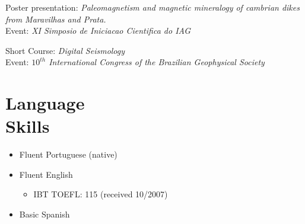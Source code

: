\documentclass[margin,line]{resume}
\begin{document}
\begin{resume}
\begin{list1}
		\item[] Poster presentation: \textit{Paleomagnetism and magnetic mineralogy of cambrian dikes from Maravilhas and Prata.}\\ 
						Event: \textit{XI Simposio de Iniciacao Cientifica do IAG}\\        

		\item[] Short Course: \textit{Digital Seismology}\\
						Event: \textit{$10^{th}$ International Congress of the Brazilian Geophysical Society }

		\end{list1}
		
		
		
		\section{\mysidestyle Language\\Skills}
		
		\begin{itemize}
			\item Fluent Portuguese (native)
			\item Fluent English 
			\begin{itemize}
				\item IBT TOEFL: 115 (received 10/2007)
			\end{itemize}
			\item Basic Spanish			
		\end{itemize}


    

    



\end{resume}
\end{document}
